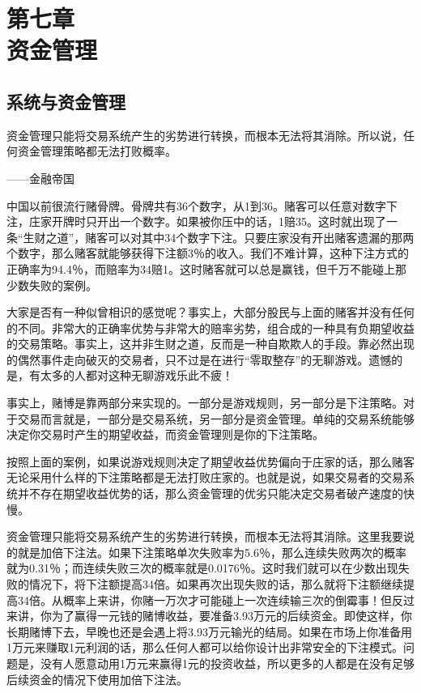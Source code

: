 \section[第七章\q 资金管理]{第七章\\ 资金管理}

\subsection{系统与资金管理}

{\kaishu
资金管理只能将交易系统产生的劣势进行转换，而根本无法将其消除。所以说，任何资金管理策略都无法打败概率。

\hfill ——金融帝国
}

中国以前很流行赌骨牌。骨牌共有36个数字，从1到36。赌客可以任意对数字下注，庄家开牌时只开出一个数字。如果被你压中的话，1赔35。这时就出现了一条“生财之道”，赌客可以对其中34个数字下注。只要庄家没有开出赌客遗漏的那两个数字，那么赌客就能够获得下注额3％的收入。我们不难计算，这种下注方式的正确率为94.4％，而赔率为34赔1。这时赌客就可以总是赢钱，但千万不能碰上那少数失败的案例。

大家是否有一种似曾相识的感觉呢？事实上，大部分股民与上面的赌客并没有任何的不同。非常大的正确率优势与非常大的赔率劣势，组合成的一种具有负期望收益的交易策略。事实上，这并非生财之道，反而是一种自欺欺人的手段。靠必然出现的偶然事件走向破灭的交易者，只不过是在进行“零取整存”的无聊游戏。遗憾的是，有太多的人都对这种无聊游戏乐此不疲！

事实上，赌博是靠两部分来实现的。一部分是游戏规则，另一部分是下注策略。对于交易而言就是，一部分是交易系统，另一部分是资金管理。单纯的交易系统能够决定你交易时产生的期望收益，而资金管理则是你的下注策略。

按照上面的案例，如果说游戏规则决定了期望收益优势偏向于庄家的话，那么赌客无论采用什么样的下注策略都是无法打败庄家的。也就是说，如果交易者的交易系统并不存在期望收益优势的话，那么资金管理的优劣只能决定交易者破产速度的快慢。

资金管理只能将交易系统产生的劣势进行转换，而根本无法将其消除。这里我要说的就是加倍下注法。如果下注策略单次失败率为5.6％，那么连续失败两次的概率就为0.31％；而连续失败三次的概率就是0.0176％。这时我们就可以在少数出现失败的情况下，将下注额提高34倍。如果再次出现失败的话，那么就将下注额继续提高34倍。从概率上来讲，你赌一万次才可能碰上一次连续输三次的倒霉事！但反过来讲，你为了赢得一元钱的赌博收益，要准备3.93万元的后续资金。即使这样，你长期赌博下去，早晚也还是会遇上将3.93万元输光的结局。如果在市场上你准备用1万元来赚取1元利润的话，那么任何人都可以给你设计出非常安全的下注模式。问题是，没有人愿意动用1万元来赢得1元的投资收益，所以更多的人都是在没有足够后续资金的情况下使用加倍下注法。

